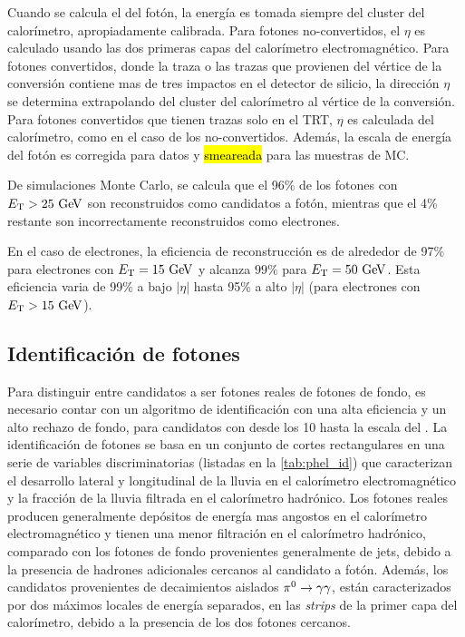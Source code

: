 Cuando se calcula el {\pt} del fotón, la energía es tomada siempre del cluster
del calorímetro, apropiadamente calibrada\cite{Banfi:1259219}. Para fotones
no-convertidos, el $\eta$ es calculado usando las dos primeras capas del
calorímetro electromagnético. Para fotones convertidos, donde la traza o las
trazas que provienen del vértice de la conversión contiene mas de tres impactos en
el detector de silicio, la dirección $\eta$ se determina extrapolando del
cluster del calorímetro al vértice de la conversión. Para fotones convertidos
que tienen trazas solo en el TRT, $\eta$ es calculada del calorímetro, %
como en el caso de los no-convertidos. Además, la escala de energía
del fotón es corregida para datos y \hl{smeareada} para las muestras de MC.

De simulaciones Monte Carlo, se calcula que el 96\% de los fotones con
$\et>25\gev$ son reconstruidos como candidatos a fotón, mientras que el 4\%
restante son incorrectamente reconstruidos como electrones. %

En el caso de electrones, la eficiencia de reconstrucción es de alrededor de
97\% para electrones con $\et=15 \gev$ y alcanza $99 \%$ para $\et=50\gev$. Esta
eficiencia varia de 99\% a bajo $|\eta|$ hasta 95\% a alto $|\eta|$ (para
electrones con $\et>15 \gev$). %


\subsection{Identificación de fotones}

Para distinguir entre candidatos a ser fotones reales de fotones de fondo, es
necesario contar con un algoritmo de identificación con una alta eficiencia y un alto rechazo
de fondo, para candidatos con {\et} desde los 10 {\gev} hasta la escala del
{\tev}. La identificación de fotones se basa en un conjunto de cortes
rectangulares en una serie de variables discriminatorias (listadas en la
\cref{tab:phel_id}) que caracterizan el desarrollo lateral y longitudinal de la
lluvia en el calorímetro electromagnético y la fracción de la lluvia filtrada en
el calorímetro hadrónico. Los fotones reales producen generalmente depósitos de
energía mas angostos en el calorímetro electromagnético y tienen una menor
filtración en el calorímetro hadrónico, comparado con los fotones de fondo
provenientes generalmente de jets, debido a la presencia de hadrones adicionales cercanos al
candidato a fotón. Además, los candidatos provenientes de
decaimientos aislados $\pi^0 \to \gam\gam$, están caracterizados por dos máximos
locales de energía separados, en las \emph{strips} de la primer capa del calorímetro,
debido a la presencia de los dos fotones cercanos.

